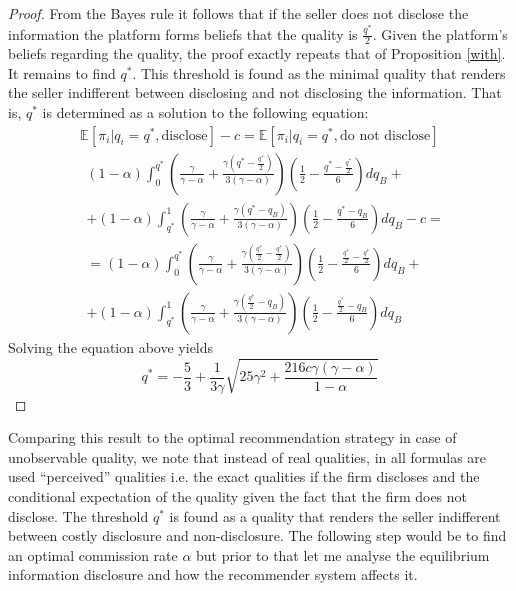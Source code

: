 \documentclass[a4paper]{article}
\begin{document}
\begin{proof}
	From the Bayes rule it follows that if the seller does not disclose the information the platform forms beliefs that the quality is $\frac{q^*}{2}$. Given the platform's beliefs regarding the quality, the proof exactly repeats that of Proposition \ref{with}. It remains to find $q^*$. This threshold is found as the minimal quality that renders the seller indifferent between disclosing and not disclosing the information. That is, $q^*$ is determined as a solution to the following equation:
	\begin{align*}
	\mathbb{E} [\pi_i|q_i=q^*, \text{disclose}] - c = \mathbb{E} [\pi_i|q_i=q^*, \text{do not disclose}]
	\end{align*}
	\begin{align*}
	&(1-\alpha)\int_{0}^{q^*} \left(\frac{\gamma}{\gamma - \alpha} + \frac{\gamma\left(q^* - \frac{q^*}{2}\right)}{3(\gamma - \alpha)} \right) \left(\frac{1}{2} - \frac{q^* - \frac{q^*}{2}}{6}\right)dq_B +\\ &+(1-\alpha)\int_{q^*}^{1} \left(\frac{\gamma}{\gamma - \alpha} + \frac{\gamma(q^* - q_B)}{3(\gamma - \alpha)} \right) \left(\frac{1}{2} - \frac{q^* - q_B}{6}\right)dq_B - c = \\
	&=(1-\alpha)\int_{0}^{q^*} \left(\frac{\gamma}{\gamma - \alpha} + \frac{\gamma\left(\frac{q^*}{2} - \frac{q^*}{2}\right)}{3(\gamma - \alpha)} \right) \left(\frac{1}{2} - \frac{\frac{q^*}{2} - \frac{q^*}{2}}{6}\right)dq_B +\\
	&+ (1-\alpha)\int_{q^*}^{1} \left(\frac{\gamma}{\gamma - \alpha} + \frac{\gamma(\frac{q^*}{2} - q_B)}{3(\gamma - \alpha)} \right) \left(\frac{1}{2} - \frac{\frac{q^*}{2} - q_B}{6}\right)dq_B
	\end{align*}
	Solving the equation above yields
	$$q^* = -\frac{5}{3} + \frac{1}{3 \gamma} \sqrt{25 \gamma^2 + \frac{216 c \gamma (\gamma - \alpha)}{1 - \alpha}}$$
\end{proof}
Comparing this result to the optimal recommendation strategy in case of unobservable quality, we note that instead of real qualities, in all formulas are used ``perceived'' qualities i.e. the exact qualities if the firm discloses and the conditional expectation of the quality given the fact that the firm does not disclose. The threshold $q^*$ is found as a quality that renders the seller indifferent between costly disclosure and non-disclosure. The following step would be to find an optimal commission rate $\alpha$ but prior to that let me analyse the equilibrium information disclosure and how the recommender system affects it.
\end{document}
